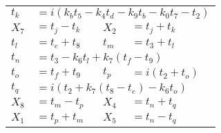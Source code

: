 \begin{tabular}{|p{4.3pt}l|p{4.3pt}l|}
$t_k $ &\multicolumn{3}{l|}{$= i(k_bt_5 - k_4t_d - k_9t_b - k_0t_7 - t_2)$}\\ 
$X_7 $ &$= t_j - t_k$ & $X_2 $ &$= t_j + t_k$\\ 
$t_l $ &$= t_e + t_8$ & $t_m $ &$= t_3 + t_l$\\ 
$t_n $ &\multicolumn{3}{l|}{$= t_3 - k_6t_l + k_7(t_f - t_9)$}\\ 
$t_o $ &$= t_f + t_9$ & $t_p $ &$= i(t_2 + t_o)$\\ 
$t_q $ &\multicolumn{3}{l|}{$= i(t_2 + k_7(t_8 - t_e) - k_6t_o)$}\\ 
$X_8 $ &$= t_m - t_p$ & $X_4 $ &$= t_n + t_q$\\ 
$X_1 $ &$= t_p + t_m$ & $X_5 $ &$= t_n - t_q$\\ 
\bottomrule\end{tabular}
